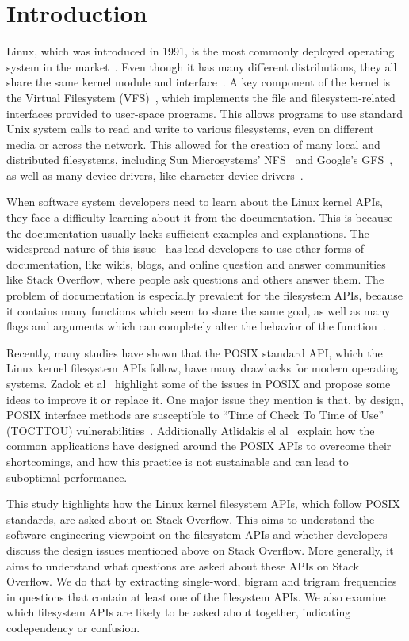 \section{Introduction}\label{sec:introductio}
Linux, which was introduced in 1991, is the most commonly deployed operating system in the market~\cite{Love2010}. Even though it has many different distributions, they all share the same kernel module and interface~\cite{Bovet2006}. A key component of the kernel is the Virtual Filesystem (VFS)~\cite{Sandberg1988}, which implements the file and filesystem-related interfaces provided to user-space programs. This allows programs to use standard Unix system calls to read and write to various filesystems, even on different media or across the network. This allowed for the creation of many local and distributed filesystems, including Sun Microsystems' NFS~\cite{Sandberg1988} and Google's GFS~\cite{Ghemawat2003}, as well as many device drivers, like character device drivers~\cite{Salzman2009, Corbet2005}.

When software system developers need to learn about the Linux kernel APIs, they face a difficulty learning about it from the documentation. This is because the documentation usually lacks sufficient examples and explanations. The widespread nature of this issue~\cite{Lethbridge2003, Robillard2009} has lead developers to use other forms of documentation, like wikis, blogs, and online question and answer communities like Stack Overflow, where people ask questions and others answer them.
The problem of documentation is especially prevalent for the filesystem APIs, because it contains many functions which seem to share the same goal, as well as many flags and arguments which can completely alter the behavior of the function~\cite{Love2010}.

Recently, many studies have shown that the POSIX standard API, which the Linux kernel filesystem APIs follow, have many drawbacks for modern operating systems. Zadok et al~\cite{Zadok2017} highlight some of the issues in POSIX and propose some ideas to improve it or replace it. One major issue they mention is that, by design, POSIX interface methods are susceptible to ``Time of Check To Time of Use'' (TOCTTOU) vulnerabilities~\cite{Wei2005}. Additionally Atlidakis el al~\cite{Atlidakis2016} explain how the common applications have designed around the POSIX APIs to overcome their shortcomings, and how this practice is not sustainable and can lead to suboptimal performance.

This study highlights how the Linux kernel filesystem APIs, which follow POSIX standards, are asked about on Stack Overflow. This aims to understand the software engineering viewpoint on the filesystem APIs and whether developers discuss the design issues mentioned above on Stack Overflow. More generally, it aims to understand what questions are asked about these APIs on Stack Overflow. We do that by extracting single-word, bigram and trigram frequencies in questions that contain at least one of the filesystem APIs. We also examine which filesystem APIs are likely to be asked about together, indicating codependency or confusion.


